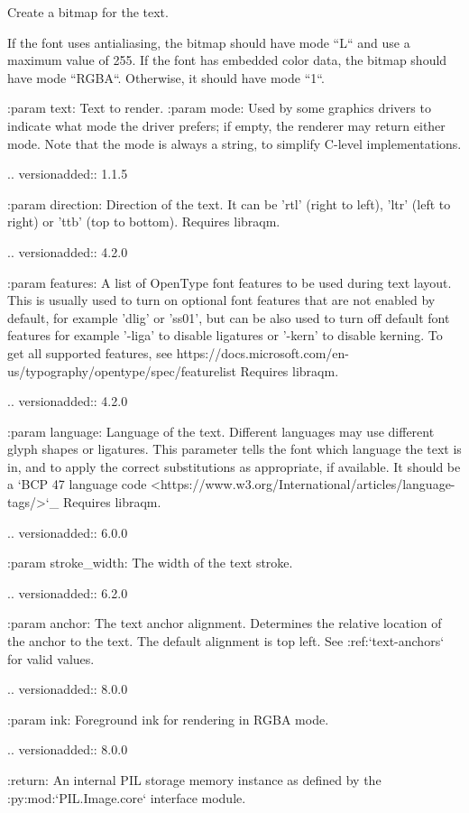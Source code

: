 \begin{DoxyVerb}Create a bitmap for the text.

If the font uses antialiasing, the bitmap should have mode ``L`` and use a
maximum value of 255. If the font has embedded color data, the bitmap
should have mode ``RGBA``. Otherwise, it should have mode ``1``.

:param text: Text to render.
:param mode: Used by some graphics drivers to indicate what mode the
     driver prefers; if empty, the renderer may return either
     mode. Note that the mode is always a string, to simplify
     C-level implementations.

     .. versionadded:: 1.1.5

:param direction: Direction of the text. It can be 'rtl' (right to
          left), 'ltr' (left to right) or 'ttb' (top to bottom).
          Requires libraqm.

          .. versionadded:: 4.2.0

:param features: A list of OpenType font features to be used during text
         layout. This is usually used to turn on optional
         font features that are not enabled by default,
         for example 'dlig' or 'ss01', but can be also
         used to turn off default font features for
         example '-liga' to disable ligatures or '-kern'
         to disable kerning.  To get all supported
         features, see
         https://docs.microsoft.com/en-us/typography/opentype/spec/featurelist
         Requires libraqm.

         .. versionadded:: 4.2.0

:param language: Language of the text. Different languages may use
         different glyph shapes or ligatures. This parameter tells
         the font which language the text is in, and to apply the
         correct substitutions as appropriate, if available.
         It should be a `BCP 47 language code
         <https://www.w3.org/International/articles/language-tags/>`_
         Requires libraqm.

         .. versionadded:: 6.0.0

:param stroke_width: The width of the text stroke.

         .. versionadded:: 6.2.0

:param anchor:  The text anchor alignment. Determines the relative location of
        the anchor to the text. The default alignment is top left.
        See :ref:`text-anchors` for valid values.

         .. versionadded:: 8.0.0

:param ink: Foreground ink for rendering in RGBA mode.

         .. versionadded:: 8.0.0

:return: An internal PIL storage memory instance as defined by the
 :py:mod:`PIL.Image.core` interface module.
\end{DoxyVerb}
